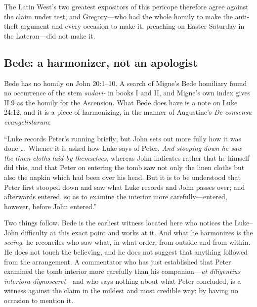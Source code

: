 The Latin West's two greatest expositors of this pericope therefore agree
against the claim under test, and Gregory---who had the whole homily to make
the anti-theft argument and every occasion to make it, preaching on Easter
Saturday in the Lateran---did not make it.

\subsection{Bede: a harmonizer, not an apologist}

Bede has no homily on John 20:1--10. A search of Migne's Bede homiliary found
no occurrence of the stem \emph{sudari-} in books I and II, and Migne's own
index gives II.9 as the homily for the Ascension. What Bede does have is a note on Luke 24:12,
and it is a piece of harmonizing, in the manner of Augustine's \emph{De
consensu evangelistarum}:

\begin{studyframe}\small
``Luke records Peter's running briefly; but John sets out more fully how it was
done \ldots\ Whence it is asked how Luke says of Peter, \emph{And stooping down
he saw the linen cloths laid by themselves}, whereas John indicates rather that
he himself did this, and that Peter on entering the tomb saw not only the linen
cloths but also the napkin which had been over his head. But it is to be
understood that Peter first stooped down and saw what Luke records and John
passes over; and afterwards entered, so as to examine the interior more
carefully---entered, however, before John
entered.''
\end{studyframe}

Two things follow. Bede is the earliest witness located here who notices the
Luke--John difficulty at this exact point and works at it. And what he
harmonizes is the \emph{seeing}: he reconciles who saw what, in what order,
from outside and from within. He does not touch the believing, and he does not
suggest that anything followed from the arrangement. A commentator who has just
established that Peter examined the tomb interior more carefully than his
companion---\emph{ut diligentius interiora dignosceret}---and who says nothing
about what Peter concluded, is a witness against the claim in the mildest and
most credible way: by having no occasion to mention it.

